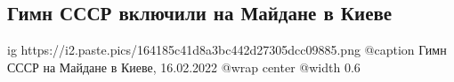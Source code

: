  
 
 
 
 
 
\subsection{Гимн СССР включили на Майдане в Киеве}
\label{sec:16_02_2022.stz.video.youtube.1.gimn_sssr_maidan_rejters}
 

\ifcmt
  ig https://i2.paste.pics/164185c41d8a3bc442d27305dcc09885.png
  @caption Гимн СССР на Майдане в Киеве, 16.02.2022
	@wrap center
	@width 0.6
\fi

